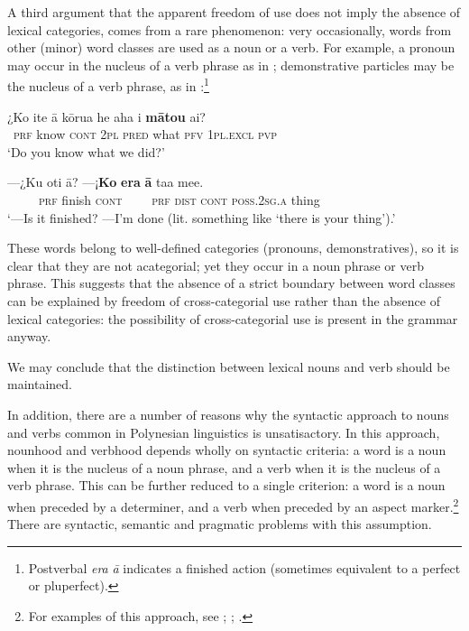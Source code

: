 A third argument that the apparent freedom of use does not imply the absence of lexical categories, comes from a rare phenomenon: very occasionally, words from other (minor) word classes are used as a noun or a verb. For example, a pronoun may occur in the nucleus of a verb phrase as in ; demonstrative particles may be the nucleus of a verb phrase, as in :\footnote{\label{fn:91}Postverbal \textit{era} \textit{{\ꞌ}ā} indicates a finished action (sometimes equivalent to a perfect or pluperfect).} 

\ea\label{ex:3.5}
\gll ¿Ko {\ꞌ}ite {\ꞌ}ā kōrua he aha i \textbf{mātou} ai?\\
~\textsc{prf} know \textsc{cont} \textsc{2pl} \textsc{pred} what \textsc{pfv} \textsc{1pl.excl} \textsc{pvp}\\

\glt 
‘Do you know what we did?’ 
\z

\ea\label{ex:3.6}
\gll —¿Ku oti {\ꞌ}ā? —¡\textbf{Ko} \textbf{era} \textbf{{\ꞌ}ā} ta{\ꞌ}a me{\ꞌ}e. \\
~~~~~\textsc{prf} finish \textsc{cont}  ~~~~\textsc{prf} \textsc{dist} \textsc{cont} \textsc{poss.2sg.a} thing \\

\glt
‘—Is it finished? —I’m done (lit. something like ‘there is your thing’).’ \textstyleExampleref{[R230.105]} 
\z

These words belong to well-defined categories (pronouns, demonstratives), so it is clear that they are not acategorial; yet they occur in a noun phrase or verb phrase. This suggests that the absence of a strict boundary between word classes can be explained by freedom of cross-categorial use rather than the absence of lexical categories: the possibility of cross-categorial use is present in the grammar anyway.

We may conclude that the distinction between lexical nouns and verb should be maintained. 

In addition, there are a number of reasons why the syntactic approach to nouns and verbs common in Polynesian linguistics is unsatisactory. In this approach, nounhood and verbhood depends wholly on syntactic criteria: a word is a noun when it is the nucleus of a noun phrase, and a verb when it is the nucleus of a verb phrase. This can be further reduced to a single criterion: a word is a noun when preceded by a determiner, and a verb when preceded by an aspect marker.\footnote{\label{fn:92}For examples of this approach, see \citet[19]{Biggs1973}; \citet[76]{MoselHovdhaugen1992}; \citet[21]{LazardPeltzer2000}.} There are syntactic, semantic and pragmatic problems with this assumption.

